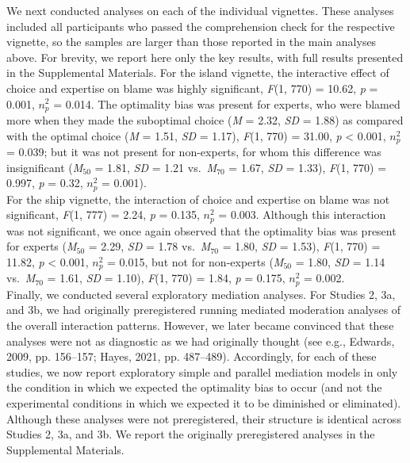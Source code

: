 \documentclass[
  man, donotrepeattitle,floatsintext]{apa6}
\begin{document}
We next conducted analyses on each of the individual vignettes. These analyses included all participants who passed the comprehension check for the respective vignette, so the samples are larger than those reported in the main analyses above. For brevity, we report here only the key results, with full results presented in the Supplemental Materials. For the island vignette, the interactive effect of choice and expertise on blame was highly significant, \emph{F}(1, 770) = 10.62, \emph{p} = 0.001, \(n^2_p\) = 0.014. The optimality bias was present for experts, who were blamed more when they made the suboptimal choice (\emph{M} = 2.32, \emph{SD} = 1.88) as compared with the optimal choice (\emph{M} = 1.51, \emph{SD} = 1.17), \emph{F}(1, 770) = 31.00, \emph{p} \textless{} 0.001, \(n^2_p\) = 0.039; but it was not present for non-experts, for whom this difference was insignificant (\emph{M}\(_{50}\) = 1.81, \emph{SD} = 1.21 vs.~\emph{M}\(_{70}\) = 1.67, \emph{SD} = 1.33), \emph{F}(1, 770) = 0.997, \emph{p} = 0.32, \(n^2_p\) = 0.001).\\
For the ship vignette, the interaction of choice and expertise on blame was not significant, \emph{F}(1, 777) = 2.24, \emph{p} = 0.135, \(n^2_p\) = 0.003. Although this interaction was not significant, we once again observed that the optimality bias was present for experts (\emph{M}\(_{50}\) = 2.29, \emph{SD} = 1.78 vs.~\emph{M}\(_{70}\) = 1.80, \emph{SD} = 1.53), \emph{F}(1, 770) = 11.82, \emph{p} \textless{} 0.001, \(n^2_p\) = 0.015, but not for non-experts (\emph{M}\(_{50}\) = 1.80, \emph{SD} = 1.14 vs.~\emph{M}\(_{70}\) = 1.61, \emph{SD} = 1.10), \emph{F}(1, 770) = 1.84, \emph{p} = 0.175, \(n^2_p\) = 0.002.\\
Finally, we conducted several exploratory mediation analyses. For Studies 2, 3a, and 3b, we had originally preregistered running mediated moderation analyses of the overall interaction patterns. However, we later became convinced that these analyses were not as diagnostic as we had originally thought (see e.g., Edwards, 2009, pp. 156--157; Hayes, 2021, pp. 487--489). Accordingly, for each of these studies, we now report exploratory simple and parallel mediation models in only the condition in which we expected the optimality bias to occur (and not the experimental conditions in which we expected it to be diminished or eliminated). Although these analyses were not preregistered, their structure is identical across Studies 2, 3a, and 3b. We report the originally preregistered analyses in the Supplemental Materials.\\
\end{document}
